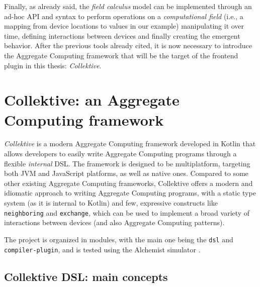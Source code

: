 \documentclass[12pt,a4paper,openright,twoside]{book}
\begin{document}
Finally, as already said, the \emph{field calculus} model can be implemented
through an ad-hoc API and syntax to perform operations on a \emph{computational
field} (i.e., a mapping from device locations to values in our example)
manipulating it over time, defining interactions between devices and finally
creating the emergent behavior.
%
After the previous tools already cited, it is now necessary to
introduce the Aggregate Computing framework that will be the target of the
frontend plugin in this thesis: \emph{Collektive}.

\section{Collektive: an Aggregate Computing framework}

\emph{Collektive} is a modern Aggregate Computing framework developed in Kotlin 
that allows developers to easily write Aggregate Computing programs through a 
flexible \emph{internal} DSL. The framework is designed to be multiplatform,
targeting both JVM and JavaScript platforms, as well as native ones. 
%
Compared to some other existing Aggregate Computing frameworks, Collektive
offers a modern and idiomatic approach to writing Aggregate Computing programs,
with a static type system (as it is internal to Kotlin) and few, expressive
constructs like \lstinline{neighboring} and \lstinline{exchange}, which can be
used to implement a broad variety of interactions between devices (and also
Aggregate Computing patterns).

The project is organized in modules, with the main one being the \lstinline{dsl}
and \lstinline{compiler-plugin}, and is tested using the Alchemist simulator
\cite{DBLP:journals/jos/PianiniMV13}. 

\subsection{Collektive DSL: main concepts}
\end{document}
